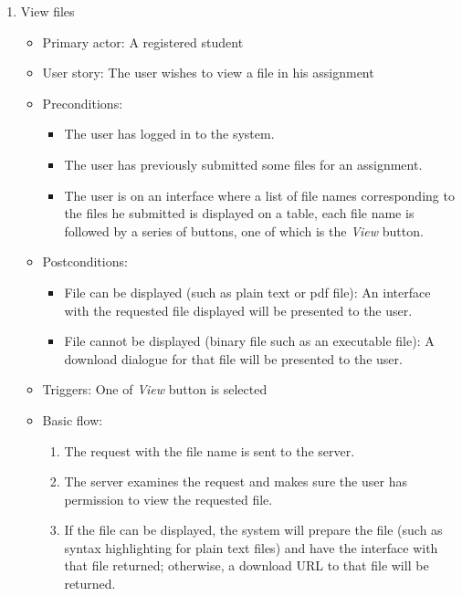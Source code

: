 \begin{enumerate}
\item View files
\begin{itemize}
    \item Primary actor: A registered student
    \item User story: The user wishes to view a file in his assignment
    \item Preconditions:
        \begin{itemize}
            \item The user has logged in to the system.
            \item The user has previously submitted some files for an
                assignment.
            \item The user is on an interface where a list of file names
                corresponding to the files he submitted is displayed on a table,
                each file name is followed by a series of buttons, one of which
                is the \emph{View} button.
        \end{itemize}
    \item Postconditions:
        \begin{itemize}
            \item File can be displayed (such as plain text or pdf file): 
                An interface with the requested file
                displayed will be presented to the user.
            \item File cannot be displayed (binary file such as an executable
                file): A download dialogue for that file will be presented to
                the user.
        \end{itemize}
    \item Triggers: 
        One of \emph{View} button is selected
    \item Basic flow:
        \begin{enumerate}
            \item The request with the file name is sent to the server.
            \item The server examines the request and makes sure the user
                has permission to view the requested file.
            \item If the file can be displayed, the system will prepare the
                file (such as syntax highlighting for plain text files) and
                have the interface with that file returned; otherwise, a download
                URL to that file will be returned.
        \end{enumerate}
\end{itemize}
\end{enumerate}


